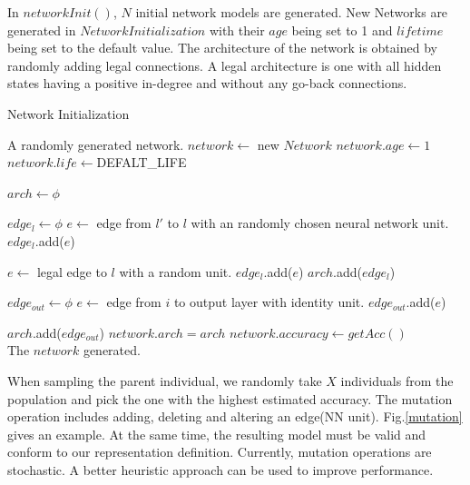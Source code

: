 \documentclass[conference]{IEEEtran}
\begin{document}
In $networkInit()$, $N$ initial network models are generated. New Networks are generated in $Network Initialization$ with their $age $ being set to 1 and $lifetime$ being set to the default value. The architecture of the network is obtained by randomly adding legal connections. A legal architecture is one with all hidden states having a positive in-degree and without any go-back connections. 

 \begin{algorithm}[H]  
	\caption{ Network Initialization}
	
	
	\begin{algorithmic}[1]  
		\Ensure A randomly generated network.
    \State $network\gets $ new $Network$
    \State $network.age\gets1$
    \State $network.life\gets $DEFALT\_LIFE 
    
    \State $arch\gets \phi$

    \State $edge_l \gets \phi$
    \State $e \gets$ edge from $l'$ to $l$ with an randomly chosen neural network unit.
    \State $edge_l$.add($e$)
    \EndIf
		\EndFor

        \State  $e \gets$ legal edge to $l$ with a random unit.
        \State $edge_l$.add($e$)
		\EndIf
    \State $arch$.add($edge_l$)
		\EndFor
    
    \State $edge_{out} \gets \phi$
      \State $e \gets$ edge from $i$ to output layer with identity unit.
      \State $edge_{out}$.add($e$)
    \EndFor

    \State $arch$.add($edge_{out}$)
    \State $network.arch=arch$
    \State $network.accuracy\gets getAcc()$
    \\
		\Return The $network$ generated.
		
	\end{algorithmic}  
\end{algorithm}  

  When sampling the parent individual, we randomly take $X$ individuals from the population and pick the one with the highest estimated accuracy. The mutation operation includes adding, deleting and altering an edge(NN unit). Fig.\ref{mutation} gives an example. At the same time, the resulting model must be valid and conform to our representation definition. Currently, mutation operations are stochastic. A better heuristic approach can be used to improve performance.
\end{document}
